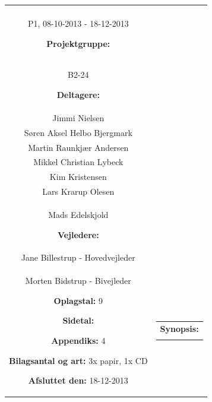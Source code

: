 \begin{titlepage}
\begin{nopagebreak}
{\begin{tabular}{cc}
{\begin{description}
						\item {\bf Projektperiode:}\\
			  				P1, 08-10-2013 - 18-12-2013 
			 				\hspace{4cm}
						\item {\bf Projektgruppe:}\\
							B2-24
			  				\hspace{4cm}
						\item {\bf Deltagere:}\\
							Jimmi Nielsen\\
							Søren Aksel Helbo Bjergmark\\
							Martin Raunkjær Andersen\\
							Mikkel Christian Lybeck\\
							Kim Kristensen\\
							Lars Krarup Olesen\\
							Mads Edelskjold
							\hspace{2cm}
						\item {\bf Vejledere:}\\
							Jane Billestrup - Hovedvejleder\\
							Morten Bidstrup - Bivejleder

						\item {\bf Oplagstal:} 9
						\item {\bf Sidetal:} \numpages
						\item {\bf Appendiks:} 4
						\item {\bf Bilagsantal og art:} 3x papir, 1x CD
						\item {\bf Afsluttet den:} 18-12-2013
					\end{description}
					\vfill
				} &
				\parbox{7cm}{
					\vspace{.15cm}
					\hfill 
					\begin{tabular}{l}
						{\bf Synopsis:}\bigskip \\
						\fbox{
							\parbox{6.5cm}{\smallskip
								{\vfill{\small 
								\smallskip}}
							}
						}
  					\end{tabular}
  				}
			\end{tabular}
		}\\
		\\
	\end{nopagebreak}
\end{titlepage}